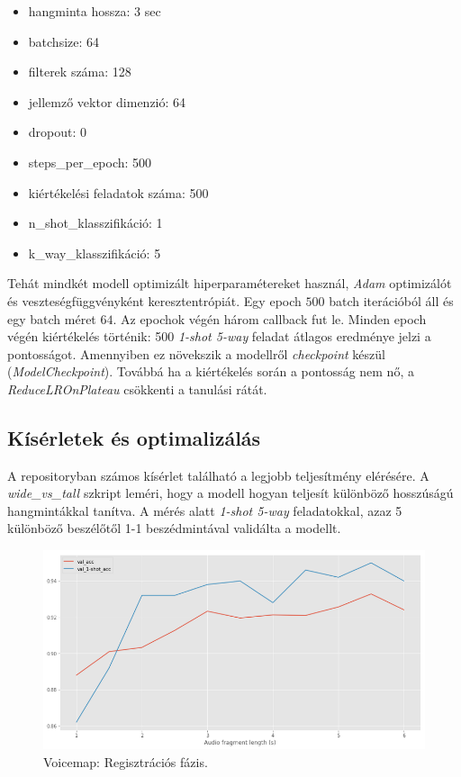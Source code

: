 \begin{itemize}
	\item hangminta hossza: 3 sec
	\item batchsize: 64
	\item filterek száma: 128
	\item jellemző vektor dimenzió: 64
	\item dropout: 0
	\item steps\_per\_epoch: 500
	\item kiértékelési feladatok száma: 500
	\item n\_shot\_klasszifikáció: 1
	\item k\_way\_klasszifikáció: 5
\end{itemize}

Tehát mindkét modell optimizált hiperparamétereket használ, \emph{Adam} optimizálót és veszteségfüggvényként keresztentrópiát. Egy epoch $500$ batch iterációból áll és egy batch méret $64$.
Az epochok végén három callback fut le.
\newline
\newline
Minden epoch végén kiértékelés történik: 500 \emph{1-shot 5-way} feladat átlagos eredménye jelzi a pontosságot. Amennyiben ez növekszik a modellről \emph{checkpoint} készül (\emph{ModelCheckpoint}).
Továbbá ha a kiértékelés során a pontosság nem nő, a \emph{ReduceLROnPlateau} csökkenti a tanulási rátát.


\subsection{Kísérletek és optimalizálás}

A repositoryban számos kísérlet található a legjobb teljesítmény elérésére. A \emph{wide\_vs\_tall} szkript leméri, hogy a modell hogyan teljesít különböző hosszúságú hangmintákkal tanítva. A mérés alatt \emph{1-shot 5-way} feladatokkal, azaz 5 különböző beszélőtől 1-1 beszédmintával validálta a modellt.

\begin{figure}[!ht]
	\centering
	\includegraphics[width=150mm, keepaspectratio]{figures/voicemap-wide-vs-tall.png}
	\caption{Voicemap: Regisztrációs fázis.}
	\label{fig:voicemap-wide-vs-tall}
\end{figure}

